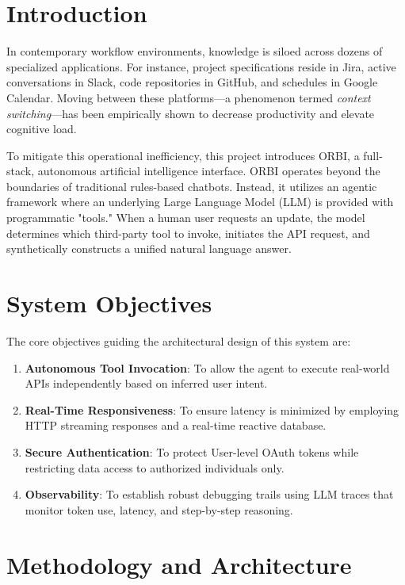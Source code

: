 \documentclass[12pt,a4paper]{article}
\begin{document}
\newpage
\tableofcontents
\newpage

\section{Introduction}
\label{sec:intro}
In contemporary workflow environments, knowledge is siloed across dozens of specialized applications. For instance, project specifications reside in Jira, active conversations in Slack, code repositories in GitHub, and schedules in Google Calendar. Moving between these platforms—a phenomenon termed \textit{context switching}—has been empirically shown to decrease productivity and elevate cognitive load.

To mitigate this operational inefficiency, this project introduces ORBI, a full-stack, autonomous artificial intelligence interface. ORBI operates beyond the boundaries of traditional rules-based chatbots. Instead, it utilizes an agentic framework where an underlying Large Language Model (LLM) is provided with programmatic "tools." When a human user requests an update, the model determines which third-party tool to invoke, initiates the API request, and synthetically constructs a unified natural language answer. 

\section{System Objectives}
The core objectives guiding the architectural design of this system are:
\begin{enumerate}
    \item \textbf{Autonomous Tool Invocation}: To allow the agent to execute real-world APIs independently based on inferred user intent.
    \item \textbf{Real-Time Responsiveness}: To ensure latency is minimized by employing HTTP streaming responses and a real-time reactive database.
    \item \textbf{Secure Authentication}: To protect User-level OAuth tokens while restricting data access to authorized individuals only.
    \item \textbf{Observability}: To establish robust debugging trails using LLM traces that monitor token use, latency, and step-by-step reasoning.
\end{enumerate}

\section{Methodology and Architecture}
\label{sec:methodology}
\end{document}
